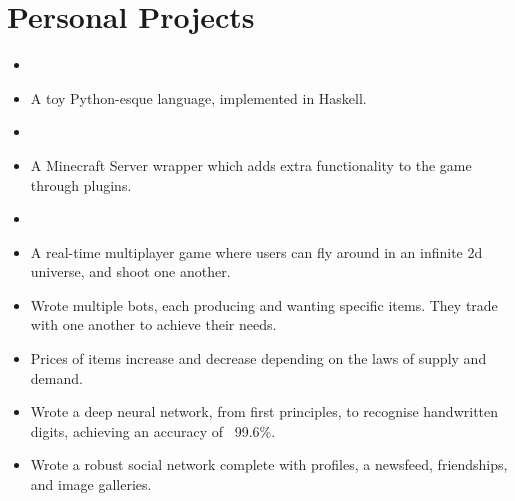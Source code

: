 \documentclass{jcgcv}
\begin{document}
\begin{column}



\section{Personal Projects}

\vspace{2pt}

\begin{itemize}
  \item {}
  \item A toy Python-esque language, implemented in Haskell.
\end{itemize}

\begin{itemize}
  \item {}
  \item A Minecraft Server wrapper which adds extra functionality to the game through plugins.
\end{itemize}

\begin{itemize}
  \item {}
  \item A real-time multiplayer game where users can fly around in an infinite 2d universe, and shoot one another.
\end{itemize}

\begin{itemize}
  \item Wrote multiple bots, each producing and wanting specific items. They trade with one another to achieve their needs.
  \item Prices of items increase and decrease depending on the laws of supply and demand.
\end{itemize}

\begin{itemize}
  \item Wrote a deep neural network, from first principles, to recognise handwritten digits, achieving an accuracy of ~99.6\%.
\end{itemize}

\begin{itemize}
  \item Wrote a robust social network complete with profiles, a newsfeed, friendships, and image galleries.
\end{itemize}


\end{column}
\end{document}
